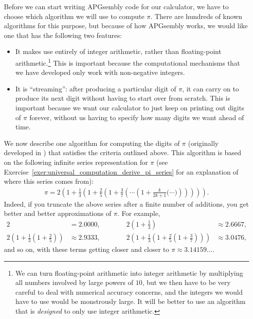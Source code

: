 Before we can start writing APGsembly code for our calculator, we have to choose which algorithm we will use to compute $\pi$. There are hundreds of known algorithms for this purpose, but because of how APGsembly works, we would like one that has the following two features:\smallskip

\begin{itemize}
	\item It makes use entirely of integer arithmetic, rather than floating-point arithmetic.\footnote{We can turn floating-point arithmetic into integer arithmetic by multiplying all numbers involved by large powers of $10$, but we then have to be very careful to deal with numerical accuracy concerns, and the integers we would have to use would be monstrously large. It will be better to use an algorithm that is \emph{designed} to only use integer arithmetic.} This is important because the computational mechanisms that we have developed only work with non-negative integers.\smallskip
	
	\item It is ``streaming'': after producing a particular digit of $\pi$, it can carry on to produce its next digit without having to start over from scratch. This is important because we want our calculator to just keep on printing out digits of $\pi$ forever, without us having to specify how many digits we want ahead of time.\smallskip
\end{itemize}

We now describe one algorithm for computing the digits of $\pi$ (originally developed in \cite{Gib06}) that satisfies the criteria outlined above. This algorithm is based on the following infinite series representation for $\pi$ (see Exercise~\ref{exer:universal_computation_derive_pi_series} for an explanation of where this series comes from):
\begin{align}\label{eq:pi_series}
	\pi = 2\left(1 + \frac{1}{3}\left( 1 + \frac{2}{5}\left( 1 + \frac{3}{7}\left( \cdots \left( 1 + \frac{k}{2k+1}\Big( \cdots \Big) \right)\right)\right)\right)\right).
\end{align}
Indeed, if you truncate the above series after a finite number of additions, you get better and better approximations of $\pi$. For example,
\begin{equation}\label{eq:pi_approx}
\begin{alignedat}{2}
2 & = 2.0000, \qquad \quad {} & 2\left(1 + \frac{1}{3}\right) & \approx 2.6667, \\
2\left(1 + \frac{1}{3}\left(1 + \frac{2}{5}\right)\right) & \approx 2.9333, \qquad \quad {} & 2\left(1 + \frac{1}{3}\left(1 + \frac{2}{5}\left(1 + \frac{3}{7}\right)\right)\right) & \approx 3.0476,
\end{alignedat}
\end{equation}
and so on, with these terms getting closer and closer to $\pi \approx 3.14159\ldots$.

